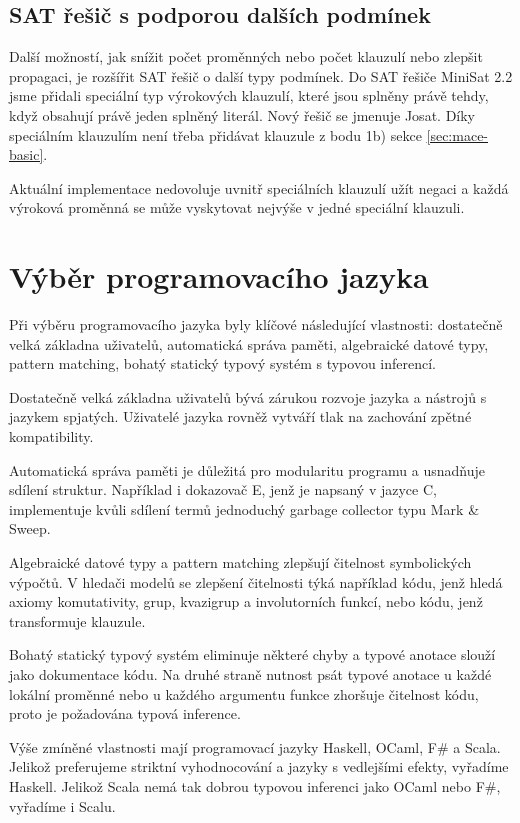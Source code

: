 \subsection{SAT řešič s podporou dalších podmínek}

Další možností, jak snížit počet proměnných nebo počet klauzulí
nebo zlepšit propagaci, je rozšířit SAT řešič o další typy podmínek.
Do SAT řešiče MiniSat 2.2 \cite{minisat} jsme přidali speciální
typ výrokových klauzulí, které jsou splněny právě tehdy,
když obsahují právě jeden splněný literál.
Nový řešič se jmenuje Josat.
Díky speciálním klauzulím není třeba přidávat klauzule
z bodu 1b) sekce \ref{sec:mace-basic}.

Aktuální implementace nedovoluje uvnitř speciálních klauzulí užít negaci
a každá výroková proměnná se může vyskytovat nejvýše v jedné
speciální klauzuli.

\section{Výběr programovacího jazyka}

Při výběru programovacího jazyka byly klíčové následující vlastnosti:
dostatečně velká základna uživatelů,
automatická správa paměti,
algebraické datové typy, pattern matching,
bohatý statický typový systém s typovou inferencí.

Dostatečně velká základna uživatelů bývá zárukou
rozvoje jazyka a nástrojů s jazykem spjatých.
Uživatelé jazyka rovněž vytváří tlak
na zachování zpětné kompatibility.

Automatická správa paměti je důležitá pro modularitu
programu a usnadňuje sdílení struktur.
Například i dokazovač E, jenž je napsaný v jazyce C,
implementuje kvůli sdílení termů
jednoduchý garbage collector typu Mark \& Sweep.

Algebraické datové typy a pattern matching
zlepšují čitelnost symbolických výpočtů.
V hledači modelů \crossbow{}
se zlepšení čitelnosti týká například kódu, jenž
hledá axiomy komutativity, grup, kvazigrup a involutorních funkcí,
nebo kódu, jenž transformuje klauzule.

Bohatý statický typový systém eliminuje některé chyby
a typové anotace slouží jako dokumentace kódu.
Na druhé straně nutnost psát typové anotace
u každé lokální proměnné nebo u každého argumentu funkce
zhoršuje čitelnost kódu, proto je požadována typová inference.

Výše zmíněné vlastnosti mají programovací jazyky
Haskell, OCaml, F\# a Scala.
Jelikož preferujeme striktní vyhodnocování
a jazyky s vedlejšími efekty, vyřadíme Haskell.
Jelikož Scala nemá tak dobrou typovou inferenci
jako OCaml nebo F\#, vyřadíme i Scalu.

